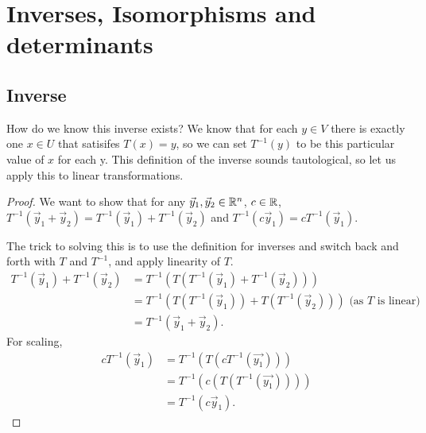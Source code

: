 \section{Inverses, Isomorphisms and determinants}
\subsection{Inverse}
How do we know this inverse exists? We know that for each $y\in V$ there is exactly one
$x\in U$ that satisifes $T(x)=y$, so we can set $T^{-1}(y)$ to be this particular value of $x$ for each y.
This definition of the inverse sounds tautological, so let us apply this to linear transformations.
\begin{proof}
    We want to show that for any $\vec{y}_1,\vec{y}_2\in\mathbb{R}^n$, $c\in \mathbb{R}$,
    $T^{-1}(\vec{y}_1+\vec{y}_2)=T^{-1}(\vec{y}_1)+T^{-1}(\vec{y}_2)$ and $T^{-1}(c\vec{y}_1)=cT^{-1}(\vec{y}_1)$.

    The trick to solving this is to use the definition for inverses and switch back and forth with $T$ and $T^{-1}$, and apply linearity of $T$.
    \begin{align*}
        T^{-1}(\vec{y}_1)+T^{-1}(\vec{y}_2) &= T^{-1}(T(T^{-1}(\vec{y}_1)+T^{-1}(\vec{y}_2)))\\
        &=T^{-1}(T(T^{-1}(\vec{y}_1))+T(T^{-1}(\vec{y}_2))) \textrm{ (as $T$ is linear)}\\
        &=T^{-1}(\vec{y}_1+\vec{y}_2).
    \end{align*}
    For scaling,\begin{align*}
        cT^{-1}(\vec{y}_1) &= T^{-1}(T(cT^{-1}(\vec{y_1})))\\
        &=T^{-1}(c(T(T^{-1}(\vec{y_1}))))\\
        &=T^{-1}(c\vec{y}_1).
    \end{align*}
\end{proof}
